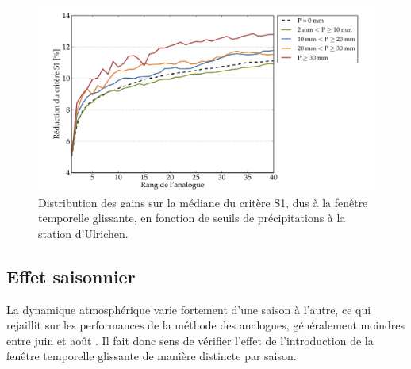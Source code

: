 \documentclass[hess]{copernicus}
\begin{document}
\begin{figure}[htb]
	\begin{center}
		\includegraphics[width=12cm]{figures/Graphique_fenetre_glissante_chmts_S1_seuils_precip.pdf}
	\end{center}
	\caption{Distribution des gains sur la médiane du critère S1, dus à la fenêtre temporelle glissante, en fonction de seuils de précipitations à la station d'Ulrichen.}
	\label{fig:Graphique_fenetre_glissante_chmts_S1_seuils_precip}
\end{figure}


\subsection{Effet saisonnier}
\label{sec:ameliorations:fenetre:S1_saisons}

La dynamique atmosphérique varie fortement d'une saison à l'autre, ce qui rejaillit sur les performances de la méthode des analogues, généralement moindres entre juin et août \citep{Bliefernicht2010}. Il fait donc sens de vérifier l'effet de l'introduction de la fenêtre temporelle glissante de manière distincte par saison.
\end{document}
